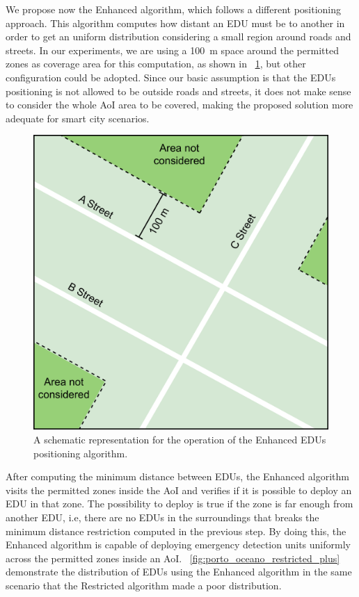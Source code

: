 \begin{refsection}
We propose now the Enhanced algorithm, which follows a different positioning approach. This algorithm computes how distant an EDU must be to another in order to get an uniform distribution considering a small region around roads and streets. In our experiments, we are using a 100~m space around the permitted zones as coverage area for this computation, as shown in \figurename~\ref{fig:restricted_plus_area}, but other configuration could be adopted. Since our basic assumption is that the EDUs positioning is not allowed to be outside roads and streets, it does not make sense to consider the whole AoI area to be covered, making the proposed solution more adequate for smart city scenarios.

\begin{figure}[!ht]
  \centering
  \includegraphics[width=0.7\linewidth]{Chapters/5-AoM/img/restricted_plus_area.png}
  \caption{A schematic representation for the operation of the Enhanced EDUs positioning algorithm.}\label{fig:restricted_plus_area}
\end{figure}

After computing the minimum distance between EDUs, the Enhanced algorithm visits the permitted zones inside the AoI and verifies if it is possible to deploy an EDU in that zone. The possibility to deploy is true if the zone is far enough from another EDU, i.e, there are no EDUs in the surroundings that breaks the minimum distance restriction computed in the previous step. By doing this, the Enhanced algorithm is capable of deploying emergency detection units uniformly across the permitted zones inside an AoI. \figurename~\ref{fig:porto_oceano_restricted_plus} demonstrate the distribution of EDUs using the Enhanced algorithm in the same scenario that the Restricted algorithm made a poor distribution.


\end{refsection}
